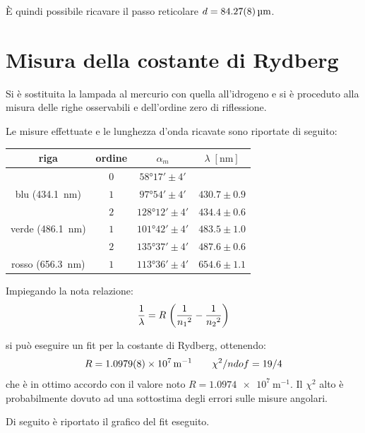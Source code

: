 È quindi possibile ricavare il passo reticolare $d=	\SI{84.27 \pm 0.08}{\micro\meter}$.

\section{Misura della costante di Rydberg}
	Si è sostituita la lampada al mercurio con quella all'idrogeno e si è proceduto alla misura delle righe osservabili e dell'ordine zero di riflessione.
	
	Le misure effettuate e le lunghezza d'onda ricavate sono riportate di seguito:
	\smallskip
	\begin{table}[H]
	\centering
		\begin{tabular}{c|c|c|c}
			riga & ordine & $\alpha _{m}$ & $\lambda \;[\si{\nm}]$ \\
		\hline
		& $ 0 $ &$\ang{58;17;} \pm 4' $ &\\
		\hline
		blu (\SI{434.1}{\nano\meter})& $ 1 $ &$\ang{97;54;} \pm 4' $ & $430.7 \pm 0.9$\\
		\hline
		 & $ 2$ & $\ang{128;12;} \pm 4' $ &$434.4 \pm 0.6$\\
		\hline
		verde (\SI{486.1}{\nano\meter}) & $ 1$ & $\ang{101;42;} \pm 4' $ &$483.5 \pm 1.0$\\
		\hline
		 &$ 2$ & $\ang{135;37;} \pm 4' $&$487.6 \pm 0.6$ \\
		\hline
		rosso (\SI{656.3}{\nano\meter})&$1$ & $\ang{113;36;} \pm 4' $ &$654.6 \pm 1.1$\\
		\end{tabular}
	\end{table}
	\smallskip

	Impiegando la nota relazione:
	\smallskip
	\begin{equation*}\label{eq:ryd}
	\frac{1}{\lambda}=R\;\biggl(\frac{1}{{n_1}^2}-\frac{1}{{n_2}^2}\biggr)
		\smallskip
	\end{equation*}

si può eseguire un fit per la costante di Rydberg, ottenendo:
$$R= \SI{1.0979\pm0.0008e7}{\meter^{-1}} \qquad \chi^2/ndof = 19/4$$ che è in ottimo accordo con il valore noto $R= \SI{1.0974e7}{\meter^{-1}}$. Il $\chi^2$ alto è probabilmente dovuto ad una sottostima degli errori sulle misure angolari.

Di seguito è riportato il grafico del fit eseguito.

